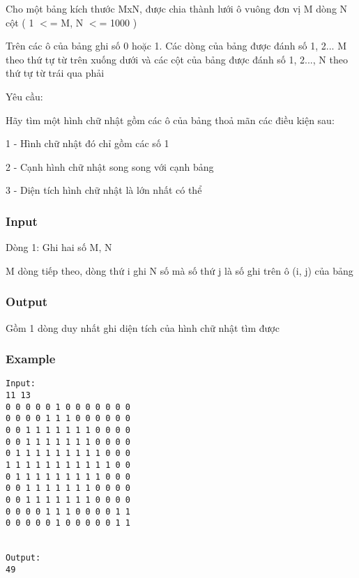 



   Cho một bảng kích thước MxN, được chia thành lưới ô vuông đơn vị M dòng N cột ( 1 $<$= M, N $<$= 1000 )  

   Trên các ô của bảng ghi số 0 hoặc 1. Các dòng của bảng được đánh số 1, 2... M theo thứ tự từ trên xuống dưới và các cột của bảng được đánh số 1, 2..., N theo thứ tự từ trái qua phải  

   Yêu cầu:  

   Hãy tìm một hình chữ nhật gồm các ô của bảng thoả mãn các điều kiện sau:  

   1 - Hình chữ nhật đó chỉ gồm các số 1  

   2 - Cạnh hình chữ nhật song song với cạnh bảng  

   3 - Diện tích hình chữ nhật là lớn nhất có thể  

\subsubsection{   Input  }

   Dòng 1: Ghi hai số M, N  

   M dòng tiếp theo, dòng thứ i ghi N số mà số thứ j là số ghi trên ô (i, j) của bảng  

\subsubsection{   Output  }

   Gồm 1 dòng duy nhất ghi diện tích của hình chữ nhật tìm được  

\subsubsection{   Example  }
\begin{verbatim}
Input:
11 13
0 0 0 0 0 1 0 0 0 0 0 0 0
0 0 0 0 1 1 1 0 0 0 0 0 0
0 0 1 1 1 1 1 1 1 0 0 0 0
0 0 1 1 1 1 1 1 1 0 0 0 0
0 1 1 1 1 1 1 1 1 1 0 0 0
1 1 1 1 1 1 1 1 1 1 1 0 0
0 1 1 1 1 1 1 1 1 1 0 0 0
0 0 1 1 1 1 1 1 1 0 0 0 0
0 0 1 1 1 1 1 1 1 0 0 0 0
0 0 0 0 1 1 1 0 0 0 0 1 1
0 0 0 0 0 1 0 0 0 0 0 1 1


Output:
49
\end{verbatim}